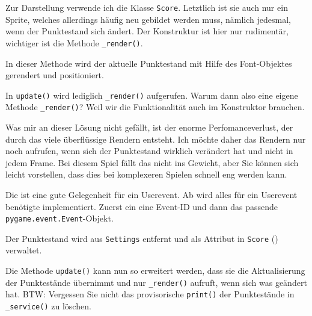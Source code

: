 Zur Darstellung verwende ich die Klasse \texttt{Score}. Letztlich ist sie auch nur ein Sprite, welches allerdings häufig neu gebildet werden muss, nämlich jedesmal, wenn der Punktestand sich ändert. Der Konstruktur ist hier nur rudimentär, wichtiger ist die Methode \texttt{\_render()}.


In dieser Methode wird der aktuelle Punktestand mit Hilfe des Font-Objektes gerendert und positioniert.


In \texttt{update()} wird lediglich \texttt{\_render()} aufgerufen. Warum dann also eine eigene Methode \texttt{\_render()}? Weil wir die Funktionalität auch im Konstruktor brauchen.


Was mir an dieser Lösung nicht gefällt, ist der enorme Perfomanceverlust, der durch das viele überflüssige Rendern entsteht. Ich möchte daher das Rendern nur noch aufrufen, wenn sich der Punktestand wirklich verändert hat und nicht in jedem Frame. Bei diesem Spiel fällt das nicht ins Gewicht, aber Sie können sich leicht vorstellen, dass dies bei komplexeren Spielen schnell eng werden kann.

Die ist eine gute Gelegenheit für ein Userevent. Ab  wird alles für ein Userevent benötigte implementiert. Zuerst ein eine Event-ID und dann das passende \texttt{pygame.e\-vent\-.E\-vent}-Objekt.


Der Punktestand wird aus \texttt{Settings} entfernt und als Attribut in \texttt{Score} () verwaltet.


Die Methode \texttt{update()} kann nun so erweitert werden, dass sie die Aktualisierung der Punktestände übernimmt und nur \texttt{\_render()} aufruft, wenn sich was geändert hat. BTW: Vergessen Sie nicht das provisorische \texttt{print()} der Punktestände in \texttt{\_service()} zu löschen.

